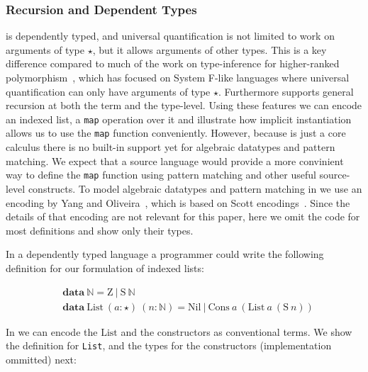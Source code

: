 \subsubsection{Recursion and Dependent Types}

\name is dependently typed, and universal quantification is not limited to work
on arguments of type $\star$, but it allows arguments of other types. This is
a key difference compared to much of the work on type-inference for higher-ranked
polymorphism~\cite{}, which has focused on System F-like
languages where universal quantification can only have arguments of type $\star$.
Furthermore \name supports general recursion at both the term and the type-level. 
Using these features we can encode an indexed list, a \verb|map| operation over it
and illustrate how implicit instantiation allows us to use the \verb|map| function
conveniently.
However, because \name is just a core calculus there is no built-in support
yet for algebraic datatypes and pattern matching.
We expect that a source language would provide a more convinient
way to define the \verb|map| function using pattern matching and other useful source-level
constructs. To model algebraic datatypes and pattern matching in \name we
use an encoding by Yang and Oliveira~\cite{pits}, which is based on Scott encodings~\cite{}.
Since the details of that encoding are not relevant for this paper,
here we omit the code for most definitions and show only their types.

In a dependently typed language a programmer could write the following definition
for our formulation of indexed lists:


\newcommand{\Nat}[0]{\mathbb{N}}
\newcommand{\Succ}[0]{\mathrm{S}}
\newcommand{\Zero}[0]{\mathrm{Z}}
\newcommand{\List}[0]{\mathrm{List}}
\newcommand{\Nil}[0]{\mathrm{Nil}}
\newcommand{\Cons}[0]{\mathrm{Cons}}
\newcommand{\map}[0]{\mathrm{map}}

\begin{align*}
  & \mathbf{data} ~ \Nat = \Zero ~|~ \Succ~\Nat \\
  & \mathbf{data} ~ \List~(a : \star)~(n : \Nat) = \Nil ~ | ~ \Cons~a~(\List~a~(\Succ~n))
\end{align*}

In \name we can encode the $\mathrm{List}$ and the constructors as conventional terms. We
show the definition for \verb|List|, and the types for the constructors (implementation ommitted)
next:


